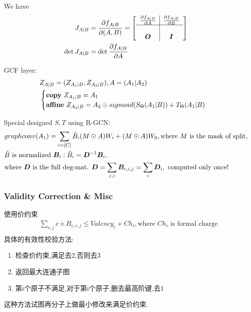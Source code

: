 \documentclass{article}
\begin{document}
    We have \begin{align}
        J_{A|B} &= \frac{\partial f_{A|B}}{\partial (A,B)}=
        \left[\begin{array}{c|c}
            \frac{\partial f_{A|B}}{\partial A} &\frac{\partial f_{A|B}}{\partial B}\\
            \hline\\
            \boldsymbol{O} & \boldsymbol{I}
        \end{array}\right]\\
        \det J_{A|B} &= \det \frac{\partial f_{A|B}}{\partial A}
    \end{align}

    GCF layer:
    \begin{align}
        & Z_{A|B} = (Z_{A_1|B},Z_{A_2|B}), A=(A_1|A_2)\\
        &\begin{cases}
            \text{\textbf{copy} }Z_{A_1|B}=A_1\\
            \text{\textbf{affine} }Z_{A_2|B}=A_2\odot sigmoid(S_\Theta(A_1|B)) + T_\Theta(A_1|B)
        \end{cases}
    \end{align}

    Special designed $S, T$ using R-GCN:
    \begin{align}
        &graphconv(A_1) = \sum_{i=[C]} \tilde B_i(M\odot A) W_i + (M\odot A) W_0, \text{where } M \text{ is the mask of split},\\
        &\tilde B \text{ is normalized } \boldsymbol{B}_i: \tilde B_i = \boldsymbol{D}^{-1} \boldsymbol{B}_i, \\
        &\text{where } \boldsymbol{D} \text{ is the full deg-mat. } \boldsymbol{D} = \sum_{c, i} \boldsymbol{B}_{c,i,j} = \sum_c \boldsymbol{D}_i, \text{ computed only once!}
    \end{align}

\subsubsection{Validity Correction \& Misc}

    使用价约束
    \begin{align}
        &\sum_{c,j} c\times B_{c,i,j} \le Valency_i+Ch_i, \text{where $Ch_i$ is formal charge}\\
    \end{align}
    具体的有效性校验方法:
    \begin{enumerate}
        \item 检查价约束,满足去2,否则去3
        \item 返回最大连通子图
        \item 第i个原子不满足,对于第i个原子,删去最高阶键,去1
    \end{enumerate}
    这种方法试图再分子上做最小修改来满足价约束.
\end{document}
